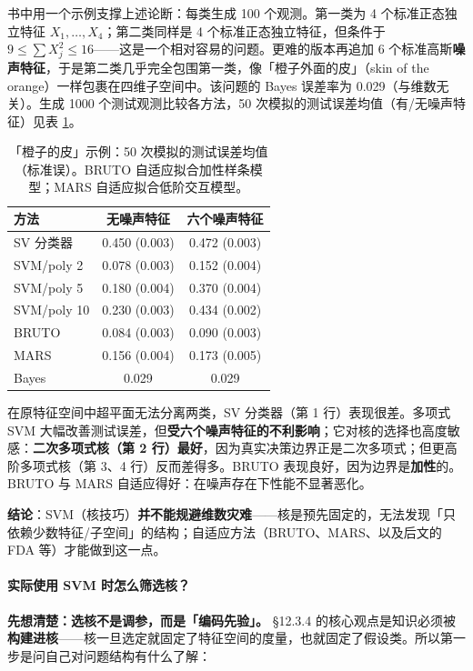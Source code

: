 书中用一个示例支撑上述论断：每类生成 100 个观测。第一类为 4 个标准正态独立特征 $X_1,\dots,X_4$；第二类同样是 4 个标准正态独立特征，但条件于 $9 \le \sum X_j^2 \le 16$——这是一个相对容易的问题。更难的版本再追加 6 个标准高斯\textbf{噪声特征}，于是第二类几乎完全包围第一类，像「橙子外面的皮」（skin of the orange）一样包裹在四维子空间中。该问题的 Bayes 误差率为 0.029（与维数无关）。生成 1000 个测试观测比较各方法，50 次模拟的测试误差均值（有/无噪声特征）见表 \ref{tab:12_2}。

\begin{table}[htbp]
\centering
\caption{「橙子的皮」示例：50 次模拟的测试误差均值（标准误）。BRUTO 自适应拟合加性样条模型；MARS 自适应拟合低阶交互模型。}
\label{tab:12_2}
\begin{tabular}{lcc}
\toprule
方法 & 无噪声特征 & 六个噪声特征 \\
\midrule
SV 分类器 & 0.450 (0.003) & 0.472 (0.003) \\
SVM/poly 2 & 0.078 (0.003) & 0.152 (0.004) \\
SVM/poly 5 & 0.180 (0.004) & 0.370 (0.004) \\
SVM/poly 10 & 0.230 (0.003) & 0.434 (0.002) \\
BRUTO & 0.084 (0.003) & 0.090 (0.003) \\
MARS & 0.156 (0.004) & 0.173 (0.005) \\
Bayes & 0.029 & 0.029 \\
\bottomrule
\end{tabular}
\end{table}

\begin{remark}[结果解读]
在原特征空间中超平面无法分离两类，SV 分类器（第 1 行）表现很差。多项式 SVM 大幅改善测试误差，但\textbf{受六个噪声特征的不利影响}；它对核的选择也高度敏感：\textbf{二次多项式核（第 2 行）最好}，因为真实决策边界正是二次多项式；但更高阶多项式核（第 3、4 行）反而差得多。BRUTO 表现良好，因为边界是\textbf{加性}的。BRUTO 与 MARS 自适应得好：在噪声存在下性能不显著恶化。

\textbf{结论}：SVM（核技巧）\textbf{并不能规避维数灾难}——核是预先固定的，无法发现「只依赖少数特征/子空间」的结构；自适应方法（BRUTO、MARS、以及后文的 FDA 等）才能做到这一点。
\end{remark}

\paragraph{实际使用 SVM 时怎么筛选核？}

\textbf{先想清楚：选核不是调参，而是「编码先验」。} §12.3.4 的核心观点是知识必须被\textbf{构建进核}——核一旦选定就固定了特征空间的度量，也就固定了假设类。所以第一步是问自己对问题结构有什么了解：

